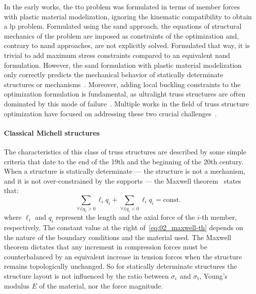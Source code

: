 In the early works, the \gls{tto} problem was formulated in terms of member forces~ with plastic material modelization, ignoring the kinematic compatibility to obtain a \gls{lp} problem. Formulated using the \gls{sand} approach, the equations of structural mechanics of the problem are imposed as constraints of the optimization and, contrary to \gls{nand} approaches, are not explicitly solved. Formulated that way, it is trivial to add maximum stress constraints compared to an equivalent \gls{nand} formulation. However, the \gls{sand} formulation with plastic material modelization only correctly predicts the mechanical behavior of statically determinate structures or mechanisms~. Moreover, adding local buckling constraints to the optimization formulation is fundamental, as ultralight truss structures are often dominated by this mode of failure~. Multiple works in the field of truss structure optimization have focused on addressing these two crucial challenges~.

\paragraph{Classical Michell structures} \label{sec:02_michell}
The characteristics of this class of truss structures are described by some simple criteria that date to the end of the 19th and the beginning of the 20th century. When a structure is statically determinate — \ie the structure is not a mechanism, and it is not over-constrained by the supports — the Maxwell theorem~ states that:
\begin{equation} \label{eq:02_maxwell-th}
    \sum_{\forall i | q_i>0}\ell_iq_i + \sum_{\forall i | q_i<0}\ell_iq_i = \textrm{const.}
\end{equation}
where $\ell_i$ and $q_i$ represent the length and the axial force of the $i$-th member, respectively. The constant value at the right of~\eqref{eq:02_maxwell-th} depends on the nature of the boundary conditions and the material used. The Maxwell theorem dictates that any increment in compression forces must be counterbalanced by an equivalent increase in tension forces when the structure remains topologically unchanged. So for statically determinate structures the structure layout is not influenced by the ratio between $\sigma_\text{c}$ and $\sigma_\text{t}$, Young's modulus $E$ of the material, nor the force magnitude.

